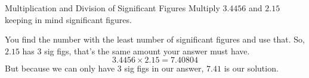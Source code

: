 \begin{example}[]{Multiplication and Division of Significant Figures}
  Multiply $3.4456$ and $2.15$ keeping in mind significant figures.

  \tcblower

  You find the number with the least number of significant figures and use that.
  So, $2.15$ has 3 sig figs, that's the same amount your answer must have.
  \[ 3.4456 \times 2.15 = 7.40804 \]
  But because we can only have 3 sig figs in our answer, $7.41$ is our solution.
\end{example}
